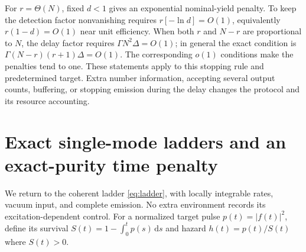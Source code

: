 \documentclass[11pt,a4paper]{article}
\newcommand{\dd}{\,\mathrm d}
\begin{document}
For \(r=\Theta(N)\), fixed \(d<1\) gives an exponential
nominal-yield penalty. To keep the detection factor nonvanishing
requires \(r[-\ln d]=O(1)\), equivalently \(r(1-d)=O(1)\) near
unit efficiency. When both \(r\) and \(N-r\) are proportional to
\(N\), the delay factor requires
\(\Gamma N^2\Delta=O(1)\); in general the exact condition is
\(\Gamma(N-r)(r+1)\Delta=O(1)\). The corresponding \(o(1)\) conditions
make the penalties tend to one. These statements apply to this
stopping rule and predetermined target. Extra number information,
accepting several output counts, buffering, or stopping emission
during the delay changes the protocol and its resource accounting.

\section{Exact single-mode ladders and an exact-purity time penalty}
\label{sec:exact}

We return to the coherent ladder \eqref{eq:ladder}, with locally
integrable rates, vacuum input, and complete emission. No extra
environment records its excitation-dependent control.
For a normalized target pulse \(p(t)=|f(t)|^2\), define its
survival \(S(t)=1-\int_0^t p(s)\dd s\) and hazard
\(h(t)=p(t)/S(t)\) where \(S(t)>0\).
\end{document}
